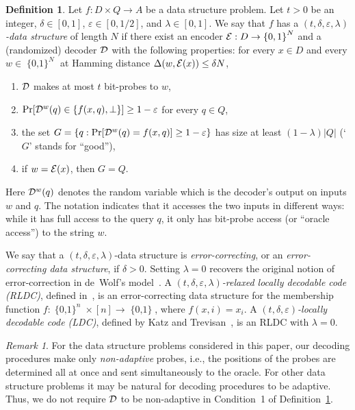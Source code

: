 \documentclass[11pt,english]{article}
\theoremstyle{definition}
\newtheorem{defn}{Definition}
\theoremstyle{remark}
\newtheorem*{rem}{Remark}
\newcommand{\eps}{\varepsilon}
\newcommand{\D}{{\cal D}}
\newcommand{\E}{{\cal E}}
\newcommand{\cube}{\operatorname{\{0, 1\}}}
\begin{document}
\begin{defn}\label{def:data structure}Let $f:D\times Q\rightarrow A$
be a data structure problem. Let $t>0$ be an integer, 
$\delta\in[0,1]$, $\eps\in[0,1/2]$, and $\lambda\in[0,1]$. We
say that $f$ has a \emph{$(t,\delta,\eps,\lambda)$-data structure}
of length $N$ if there exist an encoder $\E:D\rightarrow\cube^{N}$ and a
(randomized) decoder $\D$ with the following properties: for every $x\in D$ and every $w\in\cube^{N}$ at Hamming distance $\Delta(w,\E(x))\leq\delta N$, 
\begin{enumerate}
\item $\D$ makes at most $t$ bit-probes to $w$, 
\item $\Pr[\D^{w}(q)\in\{f(x,q),\perp\}]\geq1-\eps$ for every $q\in Q$, 
\item the set $G=\{q:\Pr[\D^{w}(q)=f(x,q)]\geq1-\eps\}$ has size at least
$(1-\lambda)|Q|$ (`$G$' stands for ``good''),
\item if $w=\E(x)$, then $G=Q$. 
\end{enumerate}
\end{defn}

Here $\D^{w}(q)$ denotes the random variable which is the decoder's output on inputs $w$ and $q$.
The notation indicates that it accesses the two inputs in different ways: 
while it has full access to the query $q$, it only has bit-probe access (or ``oracle access'') to the string $w$.

We say that a $(t,\delta,\eps,\lambda)$-data structure is \emph{error-correcting},
or an \emph{error-correcting data structure}, if $\delta>0$. 
Setting $\lambda=0$ recovers the original notion of error-correction
in de~Wolf's model~\cite{wolf:ecdata}. A \emph{$(t,\delta,\eps,\lambda)$-relaxed locally
decodable code (RLDC)}, defined in~\cite{bghsv04}, is an error-correcting
data structure for the membership function $f:\cube^{n}\times[n]\rightarrow\cube$,
where $f(x,i)=x_{i}$. A \emph{$(t,\delta,\eps)$-locally decodable code (LDC)}, defined
by Katz and Trevisan~\cite{katz&trevisan:ldc}, is an RLDC with $\lambda=0$.

\begin{rem}For the data structure problems considered in this paper,
our decoding procedures make only \emph{non-adaptive} probes, i.e.,
the positions of the probes are determined all at once and sent simultaneously
to the oracle. For other data structure problems it may be natural
for decoding procedures to be adaptive. Thus, we do not require $\D$
to be non-adaptive in Condition~1 of Definition~\ref{def:data structure}.\end{rem}
\end{document}
